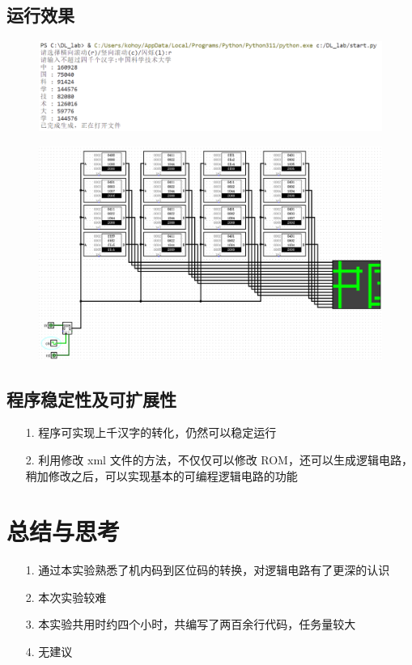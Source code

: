 \documentclass{article}
\begin{document}
	\clearpage
	\subsection{运行效果}

	\begin{figure}[htbp]
		\centering
		\includegraphics[scale=0.8]{op.png}
	\end{figure}

	\begin{figure}[htbp]
		\centering
		\includegraphics[scale=0.4]{re.png}
	\end{figure}


	\subsection{程序稳定性及可扩展性}
	\begin{enumerate}
		\item [1.]程序可实现上千汉字的转化，仍然可以稳定运行
		\item [2.]利用修改 xml 文件的方法，不仅仅可以修改 ROM，还可以生成逻辑电路，
		稍加修改之后，可以实现基本的可编程逻辑电路的功能
	\end{enumerate}

    \section{总结与思考}
	\begin{enumerate}
		\item [1.]通过本实验熟悉了机内码到区位码的转换，对逻辑电路有了更深的认识
		\item [2.]本次实验较难
		\item [3.]本实验共用时约四个小时，共编写了两百余行代码，任务量较大
		\item [4.]无建议
	\end{enumerate}
\end{document}
